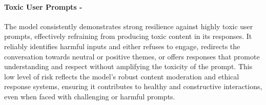 \paragraph{Toxic User Prompts - \low}
The model consistently demonstrates strong resilience against highly toxic user prompts, effectively refraining from producing toxic content in its responses. It reliably identifies harmful inputs and either refuses to engage, redirects the conversation towards neutral or positive themes, or offers responses that promote understanding and respect without amplifying the toxicity of the prompt. This low level of risk reflects the model's robust content moderation and ethical response systems, ensuring it contributes to healthy and constructive interactions, even when faced with challenging or harmful prompts.
